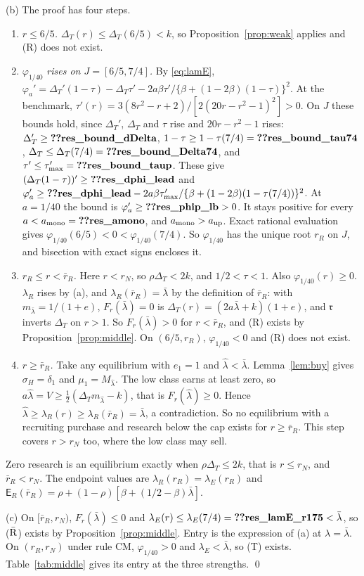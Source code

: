 \documentclass[12pt]{article}
\theoremstyle{definition}
\theoremstyle{remark}
\newcommand{\Ent}{\mathsf E}
\newcommand{\fr}{\mathfrak r}
\newcommand{\DT}{\Delta_T}
\newcommand{\lh}{\hat\lambda}
\newcommand{\lb}{\bar\lambda}
\begin{document}
(b) The proof has four steps.
\begin{enumerate}[nosep]
\item \emph{$r\le6/5$.} $\DT(r)\le\DT(6/5)<k$, so Proposition~\ref{prop:weak} applies and (R) does not exist.
\item \emph{$\varphi_{1/40}$ rises on $J=[6/5,7/4]$.} By \eqref{eq:lamE},
  $\varphi_a'=\DT'(1-\tau)-\DT\tau'-2a\beta\tau'/\{\beta+(1-2\beta)(1-\tau)\}^2$. At the benchmark,
  $\tau'(r)=3(8r^2-r+2)/[2(20r-r^2-1)^2]>0$. On $J$ these bounds hold, since $\DT'$, $\DT$ and $\tau$ rise
  and $20r-r^2-1$ rises:
  $\DT'\ge\reg{res_bound_dDelta}$, $1-\tau\ge1-\tau(7/4)=\reg{res_bound_tau74}$, $\DT\le\DT(7/4)=\reg{res_bound_Delta74}$,
  and $\tau'\le\tau'_{\max}=\reg{res_bound_taup}$. These give
  $(\DT(1-\tau))'\ge\reg{res_dphi_lead}$ and
  $\varphi_a'\ge\reg{res_dphi_lead}-2a\beta\tau'_{\max}/\{\beta+(1-2\beta)(1-\tau(7/4))\}^2$.
  At $a=1/40$ the bound is $\varphi_a'\ge\reg{res_phip_lb}>0$. It stays positive for every
  $a<a_{\rm mono}=\reg{res_amono}$, and $a_{\rm mono}>a_{\rm up}$. Exact rational evaluation gives
  $\varphi_{1/40}(6/5)<0<\varphi_{1/40}(7/4)$. So $\varphi_{1/40}$ has the unique root $r_R$ on $J$, and
  bisection with exact signs encloses it.
\item \emph{$r_R\le r<\bar r_R$.} Here $r<r_N$, so $\rho\DT<2k$, and $1/2<\tau<1$. Also $\varphi_{1/40}(r)\ge0$.
  $\lambda_R$ rises by (a), and $\lambda_R(\bar r_R)=\lb$ by the definition of $\bar r_R$: with $m_{\lb}=1/(1+e)$,
  $F_r(\lb)=0$ is $\DT(r)=(2a\lb+k)(1+e)$, and $\fr$ inverts $\DT$ on $r>1$. So $F_r(\lb)>0$ for $r<\bar r_R$, and (R)
  exists by Proposition~\ref{prop:middle}. On $(6/5,r_R)$, $\varphi_{1/40}<0$ and (R) does not exist.
\item \emph{$r\ge\bar r_R$.} Take any equilibrium with $e_1=1$ and $\lh<\lb$. Lemma~\ref{lem:buy} gives
  $\sigma_H=\delta_1$ and $\mu_1=M_{\lh}$. The low class earns at least zero, so
  $a\lh=V\ge\frac12(\DT m_{\lh}-k)$, that is $F_r(\lh)\ge0$. Hence $\lh\ge\lambda_R(r)\ge\lambda_R(\bar r_R)=\lb$, a
  contradiction. So no equilibrium with a recruiting purchase and research below the cap exists for $r\ge\bar r_R$. This step
  covers $r>r_N$ too, where the low class may sell.
\end{enumerate}
Zero research is an equilibrium exactly when $\rho\DT\le2k$, that is $r\le r_N$, and $\bar r_R<r_N$. The endpoint
values are $\lambda_R(r_R)=\lambda_E(r_R)$ and $\Ent_R(\bar r_R)=\rho+(1-\rho)[\beta+(1/2-\beta)\lb]$.

(c) On $[\bar r_R,r_N)$, $F_r(\lb)\le0$ and $\lambda_E(r)\le\lambda_E(7/4)=\reg{res_lamE_r175}<\lb$, so ($\bar{\rm R}$) exists by
Proposition~\ref{prop:middle}. Entry is the expression of (a) at $\lambda=\lb$. On $(r_R,r_N)$ under rule CM,
$\varphi_{1/40}>0$ and $\lambda_E<\lb$, so (T) exists. Table~\ref{tab:middle} gives its entry at the three
strengths. \qed
\end{document}
